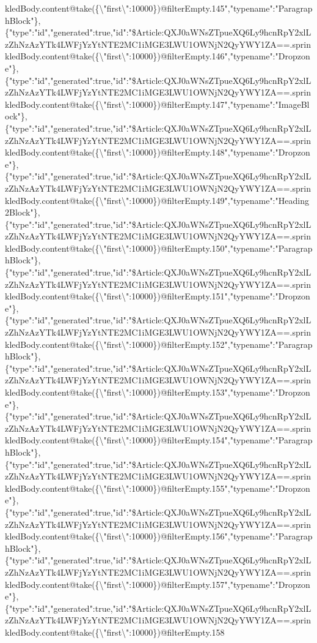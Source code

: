 kledBody.content@take(\{\textbackslash{}"first\textbackslash{}":10000\})@filterEmpty.145","typename":"ParagraphBlock"\},\{"type":"id","generated":true,"id":"\$Article:QXJ0aWNsZTpueXQ6Ly9hcnRpY2xlLzZhNzAzYTk4LWFjYzYtNTE2MC1iMGE3LWU1OWNjN2QyYWY1ZA==.sprinkledBody.content@take(\{\textbackslash{}"first\textbackslash{}":10000\})@filterEmpty.146","typename":"Dropzone"\},\{"type":"id","generated":true,"id":"\$Article:QXJ0aWNsZTpueXQ6Ly9hcnRpY2xlLzZhNzAzYTk4LWFjYzYtNTE2MC1iMGE3LWU1OWNjN2QyYWY1ZA==.sprinkledBody.content@take(\{\textbackslash{}"first\textbackslash{}":10000\})@filterEmpty.147","typename":"ImageBlock"\},\{"type":"id","generated":true,"id":"\$Article:QXJ0aWNsZTpueXQ6Ly9hcnRpY2xlLzZhNzAzYTk4LWFjYzYtNTE2MC1iMGE3LWU1OWNjN2QyYWY1ZA==.sprinkledBody.content@take(\{\textbackslash{}"first\textbackslash{}":10000\})@filterEmpty.148","typename":"Dropzone"\},\{"type":"id","generated":true,"id":"\$Article:QXJ0aWNsZTpueXQ6Ly9hcnRpY2xlLzZhNzAzYTk4LWFjYzYtNTE2MC1iMGE3LWU1OWNjN2QyYWY1ZA==.sprinkledBody.content@take(\{\textbackslash{}"first\textbackslash{}":10000\})@filterEmpty.149","typename":"Heading2Block"\},\{"type":"id","generated":true,"id":"\$Article:QXJ0aWNsZTpueXQ6Ly9hcnRpY2xlLzZhNzAzYTk4LWFjYzYtNTE2MC1iMGE3LWU1OWNjN2QyYWY1ZA==.sprinkledBody.content@take(\{\textbackslash{}"first\textbackslash{}":10000\})@filterEmpty.150","typename":"ParagraphBlock"\},\{"type":"id","generated":true,"id":"\$Article:QXJ0aWNsZTpueXQ6Ly9hcnRpY2xlLzZhNzAzYTk4LWFjYzYtNTE2MC1iMGE3LWU1OWNjN2QyYWY1ZA==.sprinkledBody.content@take(\{\textbackslash{}"first\textbackslash{}":10000\})@filterEmpty.151","typename":"Dropzone"\},\{"type":"id","generated":true,"id":"\$Article:QXJ0aWNsZTpueXQ6Ly9hcnRpY2xlLzZhNzAzYTk4LWFjYzYtNTE2MC1iMGE3LWU1OWNjN2QyYWY1ZA==.sprinkledBody.content@take(\{\textbackslash{}"first\textbackslash{}":10000\})@filterEmpty.152","typename":"ParagraphBlock"\},\{"type":"id","generated":true,"id":"\$Article:QXJ0aWNsZTpueXQ6Ly9hcnRpY2xlLzZhNzAzYTk4LWFjYzYtNTE2MC1iMGE3LWU1OWNjN2QyYWY1ZA==.sprinkledBody.content@take(\{\textbackslash{}"first\textbackslash{}":10000\})@filterEmpty.153","typename":"Dropzone"\},\{"type":"id","generated":true,"id":"\$Article:QXJ0aWNsZTpueXQ6Ly9hcnRpY2xlLzZhNzAzYTk4LWFjYzYtNTE2MC1iMGE3LWU1OWNjN2QyYWY1ZA==.sprinkledBody.content@take(\{\textbackslash{}"first\textbackslash{}":10000\})@filterEmpty.154","typename":"ParagraphBlock"\},\{"type":"id","generated":true,"id":"\$Article:QXJ0aWNsZTpueXQ6Ly9hcnRpY2xlLzZhNzAzYTk4LWFjYzYtNTE2MC1iMGE3LWU1OWNjN2QyYWY1ZA==.sprinkledBody.content@take(\{\textbackslash{}"first\textbackslash{}":10000\})@filterEmpty.155","typename":"Dropzone"\},\{"type":"id","generated":true,"id":"\$Article:QXJ0aWNsZTpueXQ6Ly9hcnRpY2xlLzZhNzAzYTk4LWFjYzYtNTE2MC1iMGE3LWU1OWNjN2QyYWY1ZA==.sprinkledBody.content@take(\{\textbackslash{}"first\textbackslash{}":10000\})@filterEmpty.156","typename":"ParagraphBlock"\},\{"type":"id","generated":true,"id":"\$Article:QXJ0aWNsZTpueXQ6Ly9hcnRpY2xlLzZhNzAzYTk4LWFjYzYtNTE2MC1iMGE3LWU1OWNjN2QyYWY1ZA==.sprinkledBody.content@take(\{\textbackslash{}"first\textbackslash{}":10000\})@filterEmpty.157","typename":"Dropzone"\},\{"type":"id","generated":true,"id":"\$Article:QXJ0aWNsZTpueXQ6Ly9hcnRpY2xlLzZhNzAzYTk4LWFjYzYtNTE2MC1iMGE3LWU1OWNjN2QyYWY1ZA==.sprinkledBody.content@take(\{\textbackslash{}"first\textbackslash{}":10000\})@filterEmpty.158
